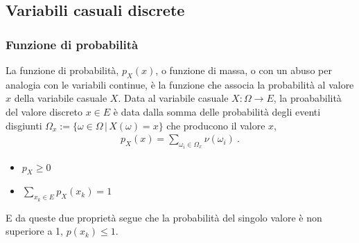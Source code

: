 \documentclass[letterpaper,10pt,italian]{jupyterBook}
\begin{document}
\sphinxstepscope


\subsection{Variabili casuali discrete}
\label{\detokenize{ch/statistics/random_variables_discrete:variabili-casuali-discrete}}\label{\detokenize{ch/statistics/random_variables_discrete:statistics-hs-random-variables-discrete}}\label{\detokenize{ch/statistics/random_variables_discrete::doc}}

\subsubsection{Funzione di probabilità}
\label{\detokenize{ch/statistics/random_variables_discrete:funzione-di-probabilita}}
\sphinxAtStartPar
La funzione di probabilità, \(p_X(x)\), o funzione di massa, o  con un abuso per analogia con le variabili continue, è la funzione che associa la probabilità al valore \(x\) della variabile casuale \(X\). Data al variabile casuale \(X: \Omega \rightarrow E\), la proababilità del valore discreto \(x \in E\) è data dalla somma delle probabilità degli eventi disgiunti \(\Omega_x := \{ \omega \in \Omega \, | \, X(\omega) = x \}\) che producono il valore \(x\),
\begin{equation*}
\begin{split}p_X(x) = \sum_{\omega_i \in \Omega_x} \nu(\omega_i) \ .\end{split}
\end{equation*}
\sphinxAtStartPar
{}
\begin{itemize}
\item {} 
\sphinxAtStartPar
\(p_X \ge 0\)

\item {} 
\sphinxAtStartPar
\(\sum_{x_k \in E} p_X(x_k) = 1\)

\end{itemize}

\sphinxAtStartPar
E da queste due proprietà segue che la probabilità del singolo valore è non superiore a 1, \(p(x_k) \le 1\).
\end{document}
